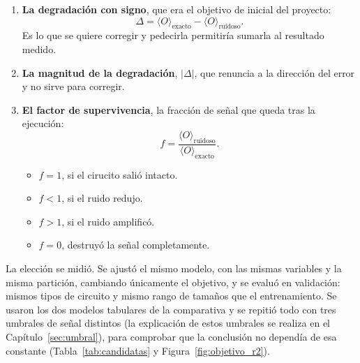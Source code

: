 \begin{enumerate}
    \item \textbf{La degradación con signo}, que era el objetivo de inicial del proyecto:
          \begin{equation}
          \label{eq:delta}
          \Delta = \langle O \rangle_{\text{exacto}} - \langle O \rangle_{\text{ruidoso}} .
          \end{equation}
          Es lo que se quiere corregir y pedecirla permitiría sumarla al resultado medido.

    \item \textbf{La magnitud de la degradación}, $|\Delta|$, que renuncia a la dirección del
          error y no sirve para corregir.

    \item \textbf{El factor de supervivencia}, la fracción de señal que queda tras la
          ejecución:
          \begin{equation}
          \label{eq:f}
          f = \frac{\langle O \rangle_{\text{ruidoso}}}{\langle O \rangle_{\text{exacto}}} .
          \end{equation}
          \begin{itemize}
            \item $f = 1$, si el cirucito salió intacto.
            \item $f < 1$, si el ruido redujo.
            \item $f > 1$, si el ruido amplificó.
            \item $f = 0$, destruyó la señal completamente.
          \end{itemize}
\end{enumerate}

La elección se midió. Se ajustó el mismo modelo, con las mismas variables y la misma partición, cambiando únicamente el objetivo, y se evaluó en validación:
mismos tipos de circuito y mismo rango de tamaños que el entrenamiento. Se usaron los dos
modelos tabulares de la comparativa y se repitió todo con tres umbrales de señal distintos (la explicación de estos umbrales se realiza en el Capítulo~\ref{sec:umbral}), para comprobar que la conclusión no dependía de esa constante
(Tabla~\ref{tab:candidatas} y Figura~\ref{fig:objetivo_r2}).

